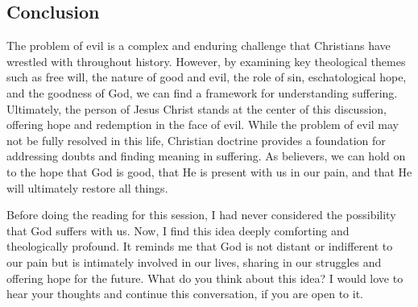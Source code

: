 \documentclass[stu,12pt,floatsintext]{apa7}
\begin{document}
\subsection{Conclusion}

The problem of evil is a complex and enduring challenge that Christians have wrestled with throughout history. However, by examining key theological themes such as free will, the nature of good and evil, the role of sin, eschatological hope, and the goodness of God, we can find a framework for understanding suffering. Ultimately, the person of Jesus Christ stands at the center of this discussion, offering hope and redemption in the face of evil. While the problem of evil may not be fully resolved in this life, Christian doctrine provides a foundation for addressing doubts and finding meaning in suffering. As believers, we can hold on to the hope that God is good, that He is present with us in our pain, and that He will ultimately restore all things.

Before doing the reading for this session, I had never considered the possibility that God suffers with us. Now, I find this idea deeply comforting and theologically profound. It reminds me that God is not distant or indifferent to our pain but is intimately involved in our lives, sharing in our struggles and offering hope for the future. What do you think about this idea? I would love to hear your thoughts and continue this conversation, if you are open to it.

\newpage

\printbibliography
\end{document}
